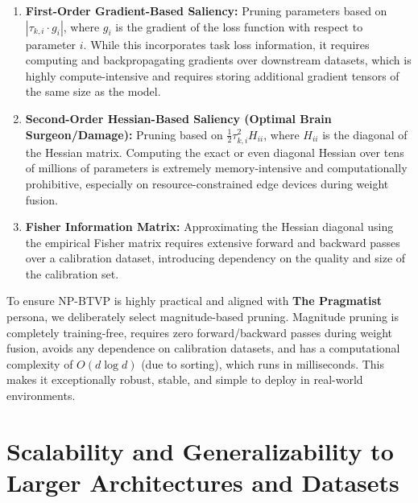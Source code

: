 \begin{enumerate}
    \item \textbf{First-Order Gradient-Based Saliency:} Pruning parameters based on $|\tau_{k, i} \cdot g_{i}|$, where $g_i$ is the gradient of the loss function with respect to parameter $i$. While this incorporates task loss information, it requires computing and backpropagating gradients over downstream datasets, which is highly compute-intensive and requires storing additional gradient tensors of the same size as the model.
    \item \textbf{Second-Order Hessian-Based Saliency (Optimal Brain Surgeon/Damage):} Pruning based on $\frac{1}{2} \tau_{k, i}^2 H_{ii}$, where $H_{ii}$ is the diagonal of the Hessian matrix. Computing the exact or even diagonal Hessian over tens of millions of parameters is extremely memory-intensive and computationally prohibitive, especially on resource-constrained edge devices during weight fusion.
    \item \textbf{Fisher Information Matrix:} Approximating the Hessian diagonal using the empirical Fisher matrix requires extensive forward and backward passes over a calibration dataset, introducing dependency on the quality and size of the calibration set.
\end{enumerate}

To ensure NP-BTVP is highly practical and aligned with \textbf{The Pragmatist} persona, we deliberately select magnitude-based pruning. Magnitude pruning is completely training-free, requires zero forward/backward passes during weight fusion, avoids any dependence on calibration datasets, and has a computational complexity of $O(d \log d)$ (due to sorting), which runs in milliseconds. This makes it exceptionally robust, stable, and simple to deploy in real-world environments.

\section{Scalability and Generalizability to Larger Architectures and Datasets}
\label{sec:appendix_scalability}

